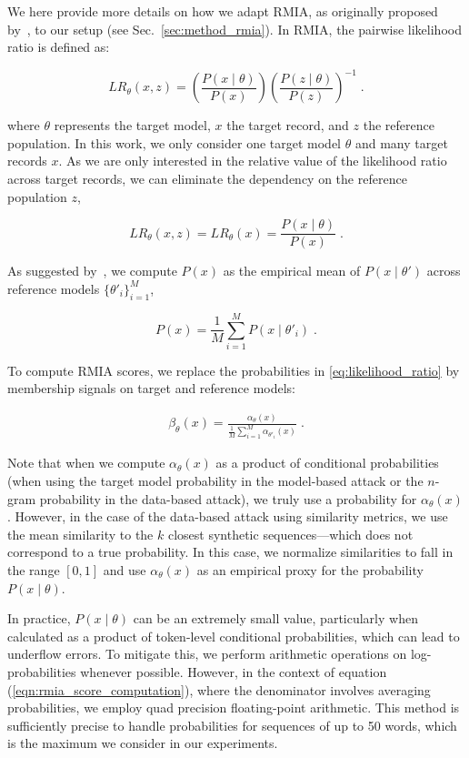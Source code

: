 We here provide more details on how we adapt RMIA, as originally proposed by~\citet{zarifzadeh2024low}, to our setup (see Sec.~\ref{sec:method_rmia}). In RMIA, the pairwise likelihood ratio is defined as: 

\begin{equation}
    LR_{\theta}(x, z) = \left(\frac{P(x\mid\theta)}{P(x)}\right) \left(\frac{P(z\mid\theta)}{P(z)}\right)^{-1} \; .
\end{equation}

where $\theta$ represents the target model, $x$ the target record, and $z$ the reference population. In this work, we only consider one target model $\theta$ and many target records $x$. As we are only interested in the relative value of the likelihood ratio across target records, we can eliminate the dependency on the reference population $z$,

\begin{equation}
    LR_{\theta}(x, z) = LR_{\theta}(x) = \frac{P(x\mid\theta)}{P(x)} \; .
    \label{eq:likelihood_ratio}
\end{equation}

As suggested by~\cite{zarifzadeh2024low}, we compute $P(x)$ as the empirical mean of $P(x\mid\theta')$ across reference models $\{ \theta'_i \}_{i=1}^M$,

\begin{equation}
    P(x) = \frac{1}{M}\sum_{i=1}^M P(x\mid\theta'_i) \; .
\end{equation}

To compute RMIA scores, we replace the probabilities in \eqref{eq:likelihood_ratio} by membership signals on target and reference models:

\begin{align}
  \beta_\theta(x) = \frac{\alpha_{\theta}(x)}{\frac{1}{M} \sum_{i=1}^M \alpha_{\theta'_i}(x)} \; .
  \label{eqn:rmia_score_computation}
\end{align}

Note that when we compute $\alpha_{\theta}(x)$ as a product of conditional probabilities (\eg when using the target model probability in the model-based attack or the $n$-gram probability in the data-based attack), we truly use a probability for $\alpha_{\theta}(x)$. However, in the case of the data-based attack using similarity metrics, we use the mean similarity to the $k$ closest synthetic sequences---which does not correspond to a true probability. In this case, we normalize similarities to fall in the range $[0,1]$ and use $\alpha_{\theta}(x)$ as an empirical proxy for the probability $P(x \mid \theta)$.

In practice, $P(x\mid\theta)$ can be an extremely small value, particularly when calculated as a product of token-level conditional probabilities, which can lead to underflow errors.
%
To mitigate this, we perform arithmetic operations on log-probabilities whenever possible. However, in the context of equation (\ref{eqn:rmia_score_computation}), where the denominator involves averaging probabilities, we employ quad precision floating-point arithmetic.
%
This method is sufficiently precise to handle probabilities for sequences of up to 50 words, which is the maximum we consider in our experiments.
